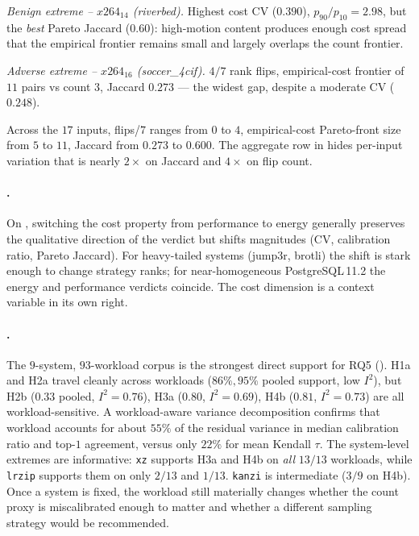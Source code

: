 \emph{Benign extreme -- $x264_{14}$ (riverbed).} Highest cost CV
($0.390$), $p_{90}/p_{10}\!=\!2.98$, but the \emph{best} Pareto Jaccard
($0.60$): high-motion content produces enough cost spread that the
empirical frontier remains small and largely overlaps the count
frontier.

\emph{Adverse extreme -- $x264_{16}$ (soccer\_4cif).} $4/7$ rank
flips, empirical-cost frontier of $11$ pairs vs count $3$, Jaccard
$0.273$ --- the widest gap, despite a moderate CV ($0.248$).

Across the $17$ inputs, flips/$7$ ranges from $0$ to $4$,
empirical-cost Pareto-front size from $5$ to $11$, Jaccard from
$0.273$ to $0.600$. The aggregate row in
 hides per-input variation that is
nearly $2\times$ on Jaccard and $4\times$ on flip count.

\paragraph*{\StudyEnergy.}
On \StudyEnergy, switching the cost property from performance to energy
generally preserves the qualitative direction of the verdict but
shifts magnitudes (CV, calibration ratio, Pareto Jaccard). For
heavy-tailed systems (jump3r, brotli) the shift is stark enough to
change strategy ranks; for near-homogeneous PostgreSQL\,11.2 the
energy and performance verdicts coincide. The cost dimension is a
context variable in its own right.

\paragraph*{\StudyWorkload.}
The $9$-system, $93$-workload corpus is the strongest direct
support for RQ5 (). H1a and H2a
travel cleanly across workloads ($86\%, 95\%$ pooled support, low
$I^{2}$), but H2b ($0.33$ pooled, $I^{2}\!=\!0.76$), H3a ($0.80$,
$I^{2}\!=\!0.69$), H4b ($0.81$, $I^{2}\!=\!0.73$) are all
workload-sensitive. A workload-aware variance decomposition
confirms that workload accounts for about $55\%$ of the residual
variance in median calibration ratio and top-$1$ agreement, versus
only $22\%$ for mean Kendall $\tau$.
The system-level extremes are informative: \texttt{xz} supports
H3a and H4b on \emph{all} $13/13$ workloads, while \texttt{lrzip}
supports them on only $2/13$ and $1/13$. \texttt{kanzi} is
intermediate ($3/9$ on H4b). Once a system is fixed, the workload
still materially changes whether the count proxy is miscalibrated
enough to matter and whether a different sampling strategy would be
recommended.


